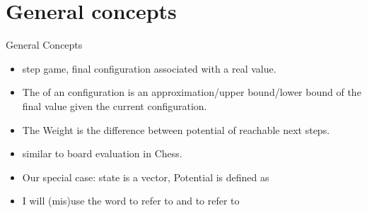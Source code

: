 \documentclass{beamer}
\begin{document}
\section{General concepts}
\begin{frame}{General Concepts}
  \begin{itemize}
  \item {} step game, final configuration associated with a real value.
  \item The  of an configuration is an approximation/upper bound/lower  bound of the final value given the current configuration.
  \item The Weight is the difference between potential of reachable next steps.
  \item similar to board evaluation in Chess.
  \item Our special case:  state is a vector, Potential is defined as
    \R{
      \[
        \Phi({\mathbf u})=\psi\left( \sum_{i=1}^n \phi(u_i)\right)
      \]}
    \item I will (mis)use the word  to refer to \R{$\phi$} and  to refer to \R{$\Phi$}
\end{itemize}
\end{frame}
\end{document}
